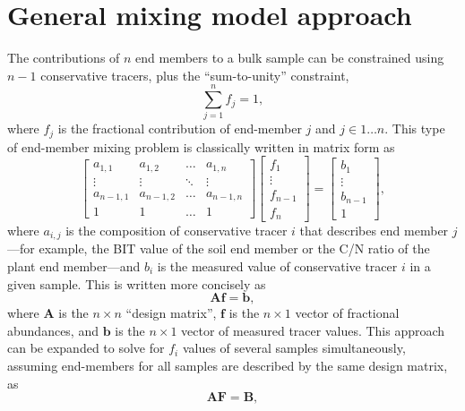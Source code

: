 \documentclass{amsart}
\begin{document}
\section{General mixing model approach}\label{Sec:1}
%
The contributions of $n$ end members to a bulk sample can be constrained using $n-1$ conservative tracers, plus the ``sum-to-unity'' constraint,
%
\begin{equation}\label{Eq:1}
	\sum_{j=1}^{n} f_j = 1,	
\end{equation}
%
where $f_j$ is the fractional contribution of end-member $j$ and $j \in 1 \dots n$. This type of end-member mixing problem is classically written in matrix form as
%
\begin{equation}\label{Eq:2}
	\begin{bmatrix}
		a_{1,1} & a_{1,2} & \dots & a_{1,n} \\
		\vdots & \vdots & \ddots & \vdots \\
		a_{n-1,1} & a_{n-1,2} & \dots & a_{n-1,n} \\
		1 & 1 & \dots & 1
	\end{bmatrix}
	\begin{bmatrix}
		f_1 \\
		\vdots \\
		f_{n-1} \\
		f_n
	\end{bmatrix}
	=
	\begin{bmatrix}
		b_{1} \\
		\vdots \\
		b_{n-1} \\
		1 
	\end{bmatrix},
\end{equation}
%
where $a_{i,j}$ is the composition of conservative tracer $i$ that describes end member $j$---for example, the BIT value of the soil end member or the C/N ratio of the plant end member---and $b_i$ is the measured value of conservative tracer $i$ in a given sample. This is written more concisely as
%
\begin{equation}\label{Eq:3}
	\bm{A}\bm{f} = \bm{b},
\end{equation}
%
where $\bm{A}$ is the $n \times n$ ``design matrix'', $\bm{f}$ is the $n \times 1$ vector of fractional abundances, and $\bm{b}$ is the $n \times 1$ vector of measured tracer values. This approach can be expanded to solve for $f_i$ values of several samples simultaneously, assuming end-members for all samples are described by the same design matrix, as
%
\begin{equation}\label{Eq:4}
	\bm{A}\bm{F} = \bm{B},
\end{equation}
\end{document}
